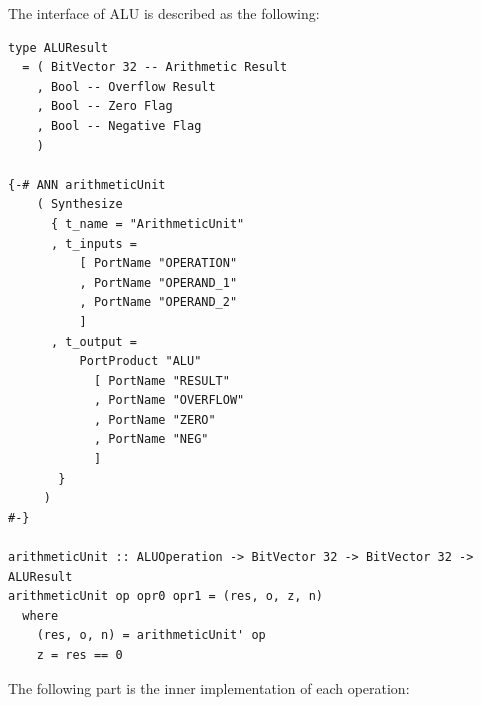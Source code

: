 \documentclass[a4paper,12pt, oneside]{book}
\begin{document}
The interface of ALU is described as the following:
\begin{verbatim}
type ALUResult
  = ( BitVector 32 -- Arithmetic Result
    , Bool -- Overflow Result
    , Bool -- Zero Flag
    , Bool -- Negative Flag
    )

{-# ANN arithmeticUnit
    ( Synthesize
      { t_name = "ArithmeticUnit"
      , t_inputs =
          [ PortName "OPERATION"
          , PortName "OPERAND_1"
          , PortName "OPERAND_2"
          ]
      , t_output =
          PortProduct "ALU"
            [ PortName "RESULT"
            , PortName "OVERFLOW"
            , PortName "ZERO"
            , PortName "NEG"
            ]
       }
     )
#-}

arithmeticUnit :: ALUOperation -> BitVector 32 -> BitVector 32 -> ALUResult
arithmeticUnit op opr0 opr1 = (res, o, z, n)
  where
    (res, o, n) = arithmeticUnit' op
    z = res == 0
\end{verbatim}
The following part is the inner implementation of each operation:
\end{document}
